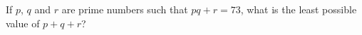 If $p$, $q$ and $r$ are prime numbers such that $pq+r=73$, what is the least possible value of $p+q+r$?
